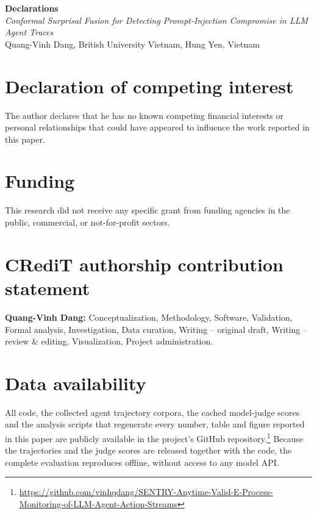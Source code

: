 \documentclass[11pt]{article}
\begin{document}
\begin{center}
{\large\bfseries Declarations}\\[0.4em]
\emph{Conformal Surprisal Fusion for Detecting Prompt-Injection Compromise in
LLM Agent Traces}\\[0.3em]
Quang-Vinh Dang, British University Vietnam, Hung Yen, Vietnam
\end{center}

\vspace{1em}

\section*{Declaration of competing interest}

The author declares that he has no known competing financial interests or personal
relationships that could have appeared to influence the work reported in this
paper.

\section*{Funding}

This research did not receive any specific grant from funding agencies in the
public, commercial, or not-for-profit sectors.

\section*{CRediT authorship contribution statement}

\textbf{Quang-Vinh Dang:} Conceptualization, Methodology, Software, Validation,
Formal analysis, Investigation, Data curation, Writing -- original draft, Writing
-- review \& editing, Visualization, Project administration.

\section*{Data availability}

All code, the collected agent trajectory corpora, the cached model-judge scores and
the analysis scripts that regenerate every number, table and figure reported in
this paper are publicly available in the project's GitHub
repository.\footnote{\raggedright
\url{https://github.com/vinhqdang/SENTRY-Anytime-Valid-E-Process-Monitoring-of-LLM-Agent-Action-Streams}}
Because the trajectories and the judge scores are released together with the code,
the complete evaluation reproduces offline, without access to any model API.
\end{document}
